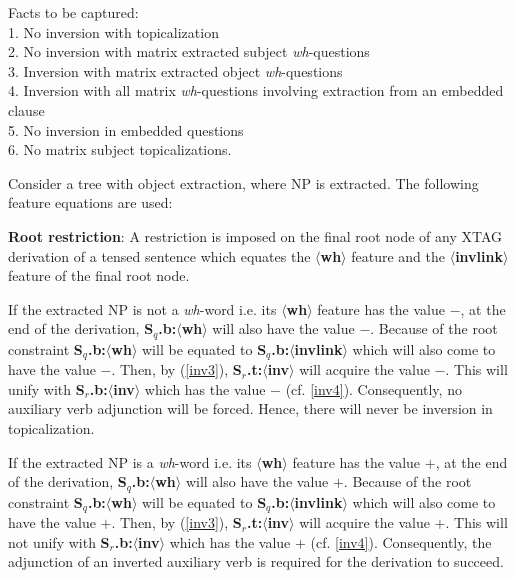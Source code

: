 Facts to be captured:\\
1. No inversion with topicalization\\
2. No inversion with matrix extracted subject {\em wh}-questions\\
3. Inversion with matrix extracted object {\em wh}-questions\\
4. Inversion with all matrix {\em wh}-questions involving extraction from an
embedded clause\\
5. No inversion in embedded questions \\
6. No matrix subject topicalizations.

Consider a tree with object extraction, where NP is extracted. 
The following feature equations are used:\\


\noindent
{\bf Root restriction}: A restriction is imposed on the final root
node of any XTAG derivation of a tensed sentence which equates the
{\bf $\langle$wh$\rangle$} feature and the {\bf
$\langle$invlink$\rangle$} feature of the final root node.

If the extracted NP is not a {\em wh}-word i.e. its {\bf
$\langle$wh$\rangle$} feature has the value $-$, at the end of the
derivation, {\bf S$_{q}$.b:$\langle$wh$\rangle$} will also have the
value $-$. Because of the root constraint {\bf
S$_{q}$.b:$\langle$wh$\rangle$} will be equated to {\bf
S$_{q}$.b:$\langle$invlink$\rangle$} which will also come to have the
value $-$. Then, by (\ref{inv3}), {\bf
S$_{r}$.t:$\langle$inv$\rangle$} will acquire the value $-$. This will
unify with {\bf S$_{r}$.b:$\langle$inv$\rangle$} which has the value
$-$ (cf. \ref{inv4}). Consequently, no auxiliary verb adjunction will
be forced. Hence, there will never be inversion in topicalization.

If the extracted NP is a {\em wh}-word i.e. its {\bf $\langle$wh$\rangle$} 
feature has the value $+$, at the end of the derivation, 
{\bf S$_{q}$.b:$\langle$wh$\rangle$} will also have the value $+$. Because of
the root constraint {\bf S$_{q}$.b:$\langle$wh$\rangle$} will be equated 
to {\bf S$_{q}$.b:$\langle$invlink$\rangle$} which will also come to have
the value $+$. Then, by (\ref{inv3}), {\bf S$_{r}$.t:$\langle$inv$\rangle$} 
will acquire the value $+$. This will not unify with {\bf S$_{r}$.b:$\langle$inv$\rangle$}
which has the value $+$ (cf. \ref{inv4}). Consequently, the adjunction
of an inverted auxiliary verb is required for the derivation to succeed.

